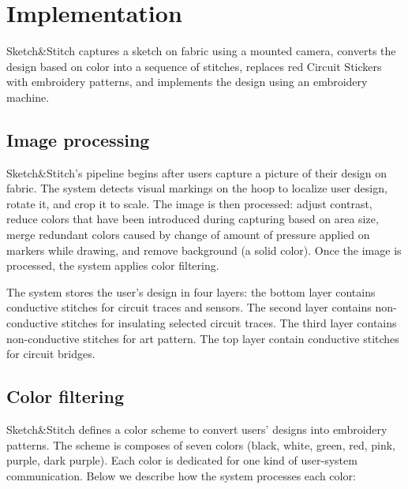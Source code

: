 \section{Implementation}
Sketch\&Stitch captures a sketch on fabric using a mounted camera, converts the design based on color into a sequence of stitches, replaces red Circuit Stickers with embroidery patterns, and implements the design using an embroidery machine.

\subsection{Image processing}

Sketch\&Stitch's pipeline begins after users capture a picture of their design on fabric. The system detects visual markings on the hoop to localize user design, rotate it, and crop it to scale. The image is then processed: adjust contrast, reduce colors that have been introduced during capturing based on area size, merge redundant colors caused by change of amount of pressure applied on markers while drawing, and remove background (a solid color). Once the image is processed, the system applies color filtering.


The system stores the user’s design in four layers: the bottom layer contains conductive stitches for circuit traces and sensors. The second layer contains non-conductive stitches for insulating selected circuit traces. The third layer contains non-conductive stitches for art pattern. The top layer contain conductive stitches for circuit bridges. 


\subsection{Color filtering}
Sketch\&Stitch defines a color scheme to convert users' designs into embroidery patterns. The scheme is composes of seven colors (black, white, green, red, pink, purple, dark purple). Each color is dedicated for one kind of user-system communication. 
Below we describe how the system processes each color:



